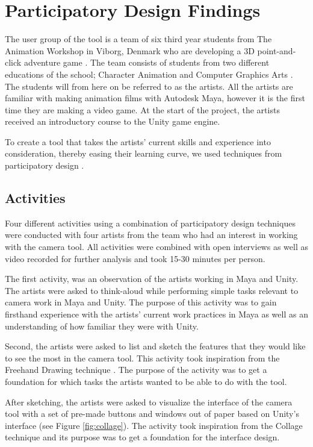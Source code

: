 \section{Participatory Design Findings}
The user group of the tool is a team of six third year students from The Animation Workshop in Viborg, Denmark who are developing a 3D point-and-click adventure game \cite{adventure_genre}.  The team consists  of students from two different educations of the school; Character Animation and Computer Graphics Arts \cite{taw_degrees}. The students will from here on be referred to as the artists.
All the artists are familiar with making animation films with Autodesk Maya, however it is the first time they are making a video game. At the start of the project, the artists received an introductory course to the Unity game engine.

To create a tool that takes the artists' current skills and experience into consideration, thereby easing their learning curve, we used techniques from participatory design \cite{part_design}.

\subsection{Activities}
Four different activities using a combination of participatory design techniques were conducted with four artists from the team who had an interest in working with the camera tool. All activities were combined with open interviews as well as video recorded for further analysis and took 15-30 minutes per person.

The first activity, was an observation \cite{part_design} of the artists working in Maya and Unity. The artists were asked to think-aloud \cite{part_design} while performing simple tasks relevant to camera work in Maya and Unity. The purpose of this activity was to gain firsthand experience with the artists' current work practices in Maya as well as an understanding of how familiar they were with Unity.

Second, the artists were asked to list and sketch the features that they would like to see the most in the camera tool. This activity took inspiration from the Freehand Drawing technique \cite{part_design}. The purpose of the activity was to get a foundation for which tasks the artists wanted to be able to do with the tool.

After sketching, the artists were asked to visualize the interface of the camera tool with a set of pre-made buttons and windows out of paper based on Unity's interface (see Figure \ref{fig:collage}). The activity took inspiration from the Collage technique \cite{part_design} and its purpose was to get a foundation for the interface design.

